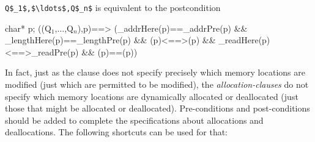 \allocates \lstinline|Q$_1$,$\ldots$,Q$_n$| is equivalent to the postcondition
\begin{listing-nonumber}
\forall char* p;
\separated(\union(Q$_1$,$\ldots$,Q$_n$),p)==>
     (\base_addr{Here}(p)==\base_addr{Pre}(p)
      && \block_length{Here}(p)==\block_length{Pre}(p)
      && (p)<==>(p)
      && \valid_read{Here}(p)<==>\valid_read{Pre}(p)
      && (p)==(p))
\end{listing-nonumber}

In fact, just as the \assigns clause does not specify precisely which memory locations are
modified (just which are permitted to be modified),
the \textsl{allocation-clauses} do not specify which memory locations
are dynamically allocated or deallocated (just those that might be allocated or deallocated).
Pre-conditions and post-conditions should be added to complete the specifications
about allocations and deallocations.
The following shortcuts can be used for that:

